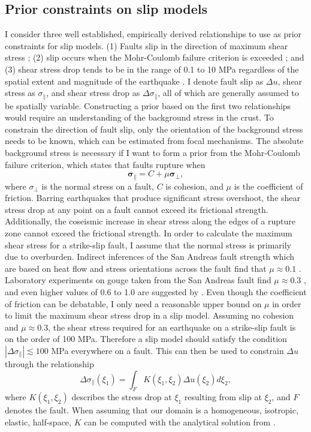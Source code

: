 \documentclass[12pt]{article}
\begin{document}
\subsection*{Prior constraints on slip models}
I consider three well established, empirically derived relationships to use as prior constraints for slip models. (1) Faults slip in the direction of maximum shear stress \citep{Wallace1951}; (2) slip occurs when the Mohr-Coulomb failure criterion is exceeded \citep{Byerlee1978}; and (3) shear stress drop tends to be in the range of 0.1 to 10 MPa regardless of the spatial extent and magnitude of the earthquake \citep{Kanamori1975,Shearer2006}. I denote fault slip as $\Delta u$, shear stress as $\sigma_\parallel$, and shear stress drop as $\Delta \sigma_\parallel$, all of which are generally assumed to be spatially variable.  Constructing a prior based on the first two relationships would require an understanding of the background stress in the crust.  To constrain the direction of fault slip, only the orientation of the background stress needs to be known, which can be estimated from focal mechanisms.  The absolute background stress is necessary if I want to form a prior from the Mohr-Coulomb failure criterion, which states that faults rupture when 
\begin{equation}\label{eq:MohrCoulomb}
  \mathbf{\sigma_\parallel} = C + \mu \mathbf{\sigma_\bot},
\end{equation}
where $\sigma_\bot$ is the normal stress on a fault, $C$ is cohesion, and $\mu$ is the coefficient of friction.  Barring earthquakes that produce significant stress overshoot, the shear stress drop at any point on a fault cannot exceed its frictional strength.  Additionally, the coseismic increase in shear stress along the edges of a rupture zone cannot exceed the frictional strength. In order to calculate the maximum shear stress for a strike-slip fault, I assume that the normal stress is primarily due to overburden.  Indirect inferences of the San Andreas fault strength which are based on heat flow and stress orientations across the fault find that $\mu\approx0.1$ \citep{Brune1969,Zoback1987}.  Laboratory experiments on gouge taken from the San Andreas fault find $\mu\approx0.3$ \citep{Carpenter2011}, and even higher values of 0.6 to 1.0 are suggested by \citet{Byerlee1978}. Even though the coefficient of friction can be debatable, I only need a reasonable upper bound on $\mu$ in order to limit the maximum shear stress drop in a slip model.  Assuming no cohesion and $\mu\approx0.3$, the shear stress required for an earthquake on a strike-slip fault is on the order of 100 MPa.  Therefore a slip model should satisfy the condition $|\Delta\sigma_\parallel|\lesssim 100$ MPa everywhere on a fault.  This can then be used to constrain $\Delta u$ through the relationship
\begin{equation}\label{eq:StressSlip}
  \Delta \sigma_\parallel (\xi_1) = \int_F K(\xi_1,\xi_2) \Delta u(\xi_2) d\xi_2,
\end{equation}
where $K(\xi_1,\xi_2)$ describes the stress drop at $\xi_1$ resulting from slip at $\xi_2$, and $F$ denotes the fault.  When assuming that our domain is a homogeneous, isotropic, elastic, half-space, $K$ can be computed with the analytical solution from \citet{Okada1992}.  
\end{document}
